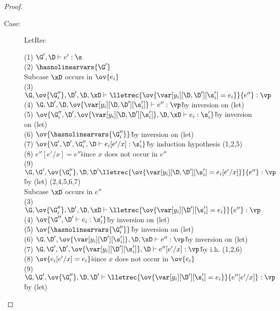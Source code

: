 \begin{proof}
\begin{description}
\item[Case:] LetRec
\begin{tabbing}
    (1) $\G',\D \vdash e' : \s$\\
    (2) $\hasnolinearvars{\G'}$\\
    Subcase $\xD$ occurs in $\ov{e_i}$\\
    (3) $\G, \ov{\G''_i}, \D', \D, \xD \vdash \lletrec{\ov{\var[y_i][\D,\D'][\s_i'] = e_i}}{e''} : \vp$\\
    (4) $\G,\D',\D,\ov{\var[y_i][\D,\D'][\s'_i]} \vdash e'' : \vp$\` by inversion on (let)\\
    (5) $\ov{\G''_i,\D', \ov{\var[y_i][\D,\D'][\s'_i]}, \D, \xD \vdash e_i : \s'_i}$\` by inversion on (let)\\
    (6) $\ov{\hasnolinearvars{\G''_i}}$\` by inversion on (let)\\
    (7) $\ov{\G',\D',\G''_i,\D \vdash e_i[e'/x] : \s'_i}$\` by induction hypothesis (1,2,5)\\
    (8) $e''[e'/x] = e''$\` since $x$ does not occur in $e''$\\
    (9) $\G,\G',\ov{\G''_i},\D,\D' \lletrec{\ov{\var[y_i][\D,\D'][\s_i'] = e_i[e'/x]}}{e''} : \vp$\` by (let) (2,4,5,6,7)\\
    Subcase $\xD$ occurs in $e''$\\
    (3) $\G, \ov{\G''_i}, \D', \D, \xD \vdash \lletrec{\ov{\var[y_i][\D'][\s_i'] = e_i}}{e''} : \vp$\\
    (4) $\ov{\G'',\D' \vdash e_i : \s'_i}$\` by inversion on (let)\\
    (5) $\ov{\hasnolinearvars{\G''_i}}$\` by inversion on (let)\\
    (6) $\G,\D',\ov{\var[y_i][\D'][\s'_i]},\D,\xD \vdash e'' : \vp$\` by inversion on (let)\\
    (7) $\G,\G',\D',\ov{\var[y_i][\D'][\s'_i]},\D \vdash e''[e'/x] : \vp$\` by i.h. (1,2,6)\\
    (8) $\ov{e_i[e'/x] = e_i}$\` since $x$ does not occur in $\ov{e_i}$\\
    (9) $\G,\G',\ov{\G''_i},\D,\D' \vdash \lletrec{\ov{\var[y_i][\D'][\s'_i] = e_i}}{e''[e'/x]} : \vp$\` by (let)\\
\end{tabbing}


\end{description}
\end{proof}
